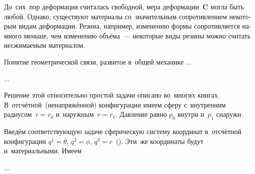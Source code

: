 \label{para:internalconstraints}

\begin{otherlanguage}{russian}

До~сих~пор деформация считалась свободной, мера деформации~$\bm{C}$ могла быть любой. Однако, существуют материалы со~значительным сопротивлением некоторым видам деформации. Резина, например, изменению формы сопротивляется намного меньше, чем изменению объёма~--- некоторые виды резины можно считать несжимаемым материалом.

Понятие геометрической связи, развитое в~общей механике ...

...



\end{otherlanguage}



\label{para:hollowsphereunderpressure}

\begin{otherlanguage}{russian}

Решение этой относительно простой задачи описано во~многих книгах. В~отсчётной~(ненапряжённой) конфигурации имеем сферу с~внутренним радиусом~${r \!=\! r_0}$ и~наружным~${r \!=\! r_1}$. Давление равно $p_0$ внутри и~$p_1$ снаружи.

Введём соответствующую задаче сферическую систему координат в~отсчётной конфигурации ${q^1 = \theta}$, ${q^2 = \phi}$, ${q^3 = r}$~(). Эти~же координаты будут и~материальными. Имеем

...



\end{otherlanguage}

\newpage



